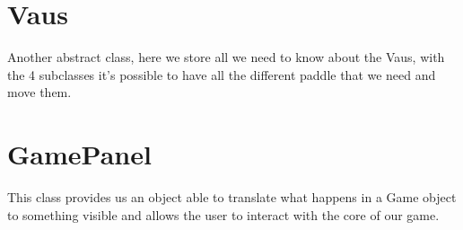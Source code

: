 \section*{Vaus}
\label{sec:vaus}
Another abstract class, here we store all we need to know about the Vaus, with the 4 subclasses it's possible to have all the different paddle that we need and move them.

\section*{GamePanel}
\label{sec:gamepanel}
This class provides us an object able to translate what happens in a Game object to something visible and allows the user to interact with the core of our game.